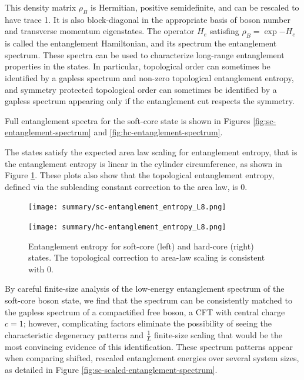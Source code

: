 \documentclass{article}
\begin{document}
This density matrix $\rho_{B}$ is Hermitian, positive semidefinite, and can be rescaled to have trace 1. It is also block-diagonal in the appropriate basis of boson number and transverse momentum eigenstates. The operator $H_e$ satisfing $\rho_{B} = \exp{-H_e}$ is called the entanglement Hamiltonian, and its spectrum the entanglement spectrum. 
These spectra can be used to characterize long-range entanglement properties in the states. In particular, topological order can sometimes be identified by a gapless spectrum and non-zero topological entanglement entropy, 
and symmetry protected topological order can sometimes be identified by a gapless spectrum appearing only if the entanglement cut respects the symmetry.%

Full entanglement spectra for the soft-core state is shown in Figures \ref{fig:sc-entanglement-spectrum} and \ref{fig:hc-entanglement-spectrum}. 

The states satisfy the expected area law scaling for entanglement entropy, that is the entanglement entropy is linear in the cylinder circumference, as shown in Figure \ref{fig:entanglement-entropy}. These plots also show that the topological entanglement entropy, defined via the subleading constant correction to the area law, is 0. 
\begin{figure}[hbctp]
\centering
\begin{minipage}{.5\linewidth}
  \centering
  \texttt{[image: summary/sc-entanglement\_entropy\_L8.png]}
\end{minipage}%
\begin{minipage}{.5\linewidth}
  \centering
  \texttt{[image: summary/hc-entanglement\_entropy\_L8.png]}
\end{minipage}
\caption{Entanglement entropy for soft-core (left) and hard-core (right) states. The topological correction to area-law scaling is consistent with 0.}
\label{fig:entanglement-entropy}
\end{figure}


By careful finite-size analysis of the low-energy entanglement spectrum of the soft-core boson state, we find that the spectrum can be consistently matched to the gapless spectrum of a compactified free boson, a CFT with central charge $c = 1$; however, complicating factors eliminate the possibility of seeing the characteristic degeneracy patterns and $\frac{1}{L}$ finite-size scaling that would be the most convincing evidence of this identification. These spectrum patterns appear when comparing shifted, rescaled entanglement energies over several system sizes, as detailed in Figure \ref{fig:sc-scaled-entanglement-spectrum}.
\end{document}

